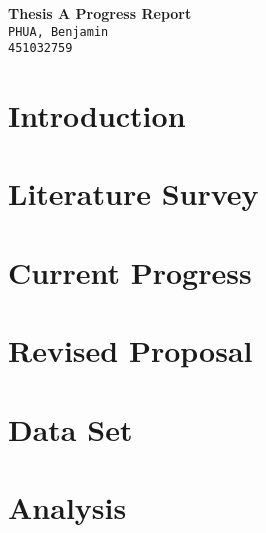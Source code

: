 \documentclass[10pt,twocolumn]{article}
\begin{document}
	\begin{center}
		\textbf{\Large Thesis A Progress Report} \\\vspace{4mm}
		\texttt{PHUA, Benjamin\\451032759}
	\end{center}

	\section{Introduction}
		

	\section{Literature Survey}

	\section{Current Progress}

	\section{Revised Proposal}

	\section{Data Set}
		
	\section{Analysis}

	
		
	
	\begin{thebibliography}{9}
		
	\end{thebibliography}
\end{document}
